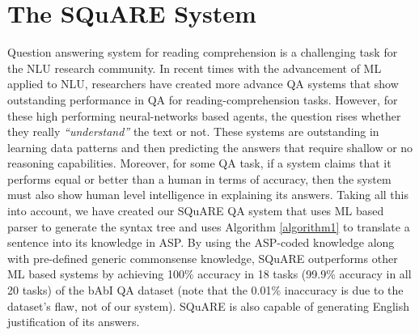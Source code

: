 \documentclass[letterpaper]{article}
\begin{document}
\section{The SQuARE System}
Question answering system for reading comprehension is a challenging task for the NLU research community. In recent times with the advancement of ML applied to NLU, researchers have created more advance QA systems that show outstanding performance in QA for reading-comprehension tasks. However, for these high performing neural-networks based agents, the question rises whether they really \textit{``understand''} the text or not. These systems are outstanding in learning data patterns and then predicting the answers that require shallow or no reasoning capabilities. Moreover, for some QA task, if a system claims that it performs equal or better than a human in terms of accuracy, then the system must also show human level intelligence in explaining its answers. Taking all this into account, we have created our SQuARE QA system that uses ML based parser to generate the syntax tree and uses Algorithm \ref{algorithm1} to translate a sentence into its knowledge in ASP. By using the ASP-coded knowledge along with pre-defined generic commonsense knowledge, SQuARE outperforms other ML based systems by achieving 100\% accuracy in 18 tasks (99.9\% accuracy in all 20 tasks) of the bAbI QA dataset (note that the 0.01\% inaccuracy is due to the dataset's flaw, not of our system). SQuARE is also capable of generating English justification of its answers.
\end{document}
